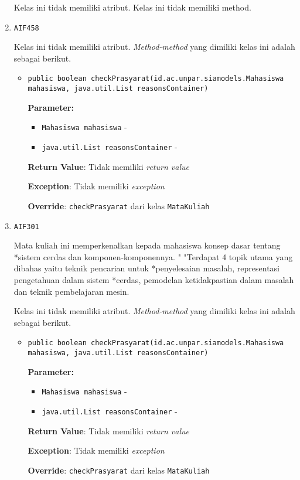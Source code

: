 \documentclass{article}
\begin{document}
\begin{enumerate}
Kelas ini tidak memiliki atribut. Kelas ini tidak memiliki method. \item \texttt{AIF458}



Kelas ini tidak memiliki atribut. \textit{Method-method} yang dimiliki kelas ini adalah sebagai berikut.
\begin{itemize}
\item \texttt{public boolean checkPrasyarat(id.ac.unpar.siamodels.Mahasiswa mahasiswa, java.util.List reasonsContainer)}

\textbf{Parameter:}
\begin{itemize}
\item \texttt{Mahasiswa mahasiswa} - 
\item \texttt{java.util.List reasonsContainer} - 
\end{itemize}
\textbf{Return Value}: Tidak memiliki \textit{return value}

\textbf{Exception}: Tidak memiliki \textit{exception}

\textbf{Override}: \texttt{checkPrasyarat} dari kelas \texttt{MataKuliah}

\end{itemize}
\item \texttt{AIF301}

Mata kuliah ini memperkenalkan kepada mahasiswa konsep dasar tentang *sistem
 cerdas dan komponen-komponennya. " "Terdapat 4 topik utama yang dibahas yaitu
 teknik pencarian untuk *penyelesaian masalah, representasi pengetahuan dalam
 sistem *cerdas, pemodelan ketidakpastian dalam masalah dan teknik
 pembelajaran mesin.

Kelas ini tidak memiliki atribut. \textit{Method-method} yang dimiliki kelas ini adalah sebagai berikut.
\begin{itemize}
\item \texttt{public boolean checkPrasyarat(id.ac.unpar.siamodels.Mahasiswa mahasiswa, java.util.List reasonsContainer)}

\textbf{Parameter:}
\begin{itemize}
\item \texttt{Mahasiswa mahasiswa} - 
\item \texttt{java.util.List reasonsContainer} - 
\end{itemize}
\textbf{Return Value}: Tidak memiliki \textit{return value}

\textbf{Exception}: Tidak memiliki \textit{exception}

\textbf{Override}: \texttt{checkPrasyarat} dari kelas \texttt{MataKuliah}


\end{itemize}
\end{enumerate}
\end{document}
